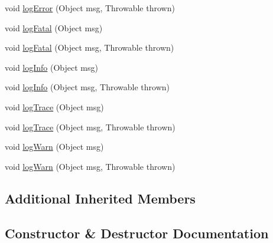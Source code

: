 \begin{DoxyCompactItemize}
\item 
void \mbox{\hyperlink{classcom_1_1mysql_1_1cj_1_1log_1_1_slf4_j_logger_a30a623739677aa264670ff888fff2958}{log\+Error}} (Object msg, Throwable thrown)
\item 
void \mbox{\hyperlink{classcom_1_1mysql_1_1cj_1_1log_1_1_slf4_j_logger_a60d9438bd9dfae5451a25543e2d4584a}{log\+Fatal}} (Object msg)
\item 
void \mbox{\hyperlink{classcom_1_1mysql_1_1cj_1_1log_1_1_slf4_j_logger_ac61e11ed170d64dec00903990ac86778}{log\+Fatal}} (Object msg, Throwable thrown)
\item 
void \mbox{\hyperlink{classcom_1_1mysql_1_1cj_1_1log_1_1_slf4_j_logger_a3444f6e7cb48a80d3cf82acf93a74c27}{log\+Info}} (Object msg)
\item 
void \mbox{\hyperlink{classcom_1_1mysql_1_1cj_1_1log_1_1_slf4_j_logger_ad6eaf1dfaaa8f7f4c7a092852a4add0f}{log\+Info}} (Object msg, Throwable thrown)
\item 
void \mbox{\hyperlink{classcom_1_1mysql_1_1cj_1_1log_1_1_slf4_j_logger_aa2d6ea6567c9c148b7170d771686386b}{log\+Trace}} (Object msg)
\item 
void \mbox{\hyperlink{classcom_1_1mysql_1_1cj_1_1log_1_1_slf4_j_logger_aa93d48c2e1172db2949b2ac64e58052a}{log\+Trace}} (Object msg, Throwable thrown)
\item 
void \mbox{\hyperlink{classcom_1_1mysql_1_1cj_1_1log_1_1_slf4_j_logger_a9b6bd04f7179ae6e572fb9ac91ade49e}{log\+Warn}} (Object msg)
\item 
void \mbox{\hyperlink{classcom_1_1mysql_1_1cj_1_1log_1_1_slf4_j_logger_a617f07e2c9b52bc774d8e8ea83ace092}{log\+Warn}} (Object msg, Throwable thrown)
\end{DoxyCompactItemize}
\subsection*{Additional Inherited Members}


\subsection{Constructor \& Destructor Documentation}
\mbox{\label{classcom_1_1mysql_1_1cj_1_1log_1_1_slf4_j_logger_af5581eba75f230b5acbb76789e679593}} 
